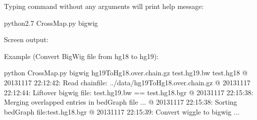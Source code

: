 \documentclass[letterpaper,10pt,english]{sphinxmanual}
\begin{document}
Typing command without any arguments will print help message:

\begin{sphinxVerbatim}[commandchars=\\\{\}]
\PYGZdl{} python2.7 CrossMap.py  bigwig
\end{sphinxVerbatim}

Screen output:

\begin{sphinxVerbatim}[commandchars=\\\{\}]
      

            
             
     

      
\end{sphinxVerbatim}

Example (Convert BigWig file from hg18 to hg19):

\begin{sphinxVerbatim}[commandchars=\\\{\}]
\PYGZdl{} python CrossMap.py bigwig  hg19ToHg18.over.chain.gz  test.hg19.bw test.hg18
@ 2013\PYGZhy{}11\PYGZhy{}17 22:12:42: Read chain\PYGZus{}file:  ../data/hg19ToHg18.over.chain.gz
@ 2013\PYGZhy{}11\PYGZhy{}17 22:12:44: Liftover bigwig file: test.hg19.bw ==\PYGZgt{} test.hg18.bgr
@ 2013\PYGZhy{}11\PYGZhy{}17 22:15:38: Merging overlapped entries in bedGraph file ...
@ 2013\PYGZhy{}11\PYGZhy{}17 22:15:38: Sorting bedGraph file:test.hg18.bgr
@ 2013\PYGZhy{}11\PYGZhy{}17 22:15:39: Convert wiggle to bigwig ...
\end{sphinxVerbatim}
\end{document}
